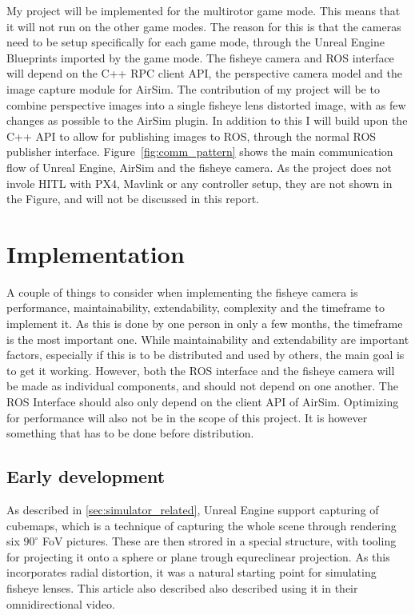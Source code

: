My project will be implemented for the multirotor game mode. This means that it will not run on the other game modes. The reason for this is that the cameras need to be setup specifically for each game mode, through the Unreal Engine Blueprints imported by the game mode. The fisheye camera and ROS interface will depend on the C++ RPC client API, the perspective camera model and the image capture module for AirSim. The contribution of my project will be to combine perspective images into a single fisheye lens distorted image, with as few changes as possible to the AirSim plugin. In addition to this I will build upon the C++ API to allow for publishing images to ROS, through the normal ROS publisher interface. Figure~\ref{fig:comm_pattern} shows the main communication flow of Unreal Engine, AirSim and the fisheye camera. As the project does not invole HITL with PX4, Mavlink or any controller setup, they are not shown in the Figure, and will not be discussed in this report.

\section{Implementation}

A couple of things to consider when implementing the fisheye camera is performance, maintainability, extendability, complexity and the timeframe to implement it. As this is done by one person in only a few months, the timeframe is the most important one. While maintainability and extendability are important factors, especially if this is to be distributed and used by others, the main goal is to get it working. However, both the ROS interface and the fisheye camera will be made as individual components, and should not depend on one another. The ROS Interface should also only depend on the client API of AirSim. Optimizing for performance will also not be in the scope of this project. It is however something that has to be done before distribution.

\subsection{Early development}

As described in \ref{sec:simulator_related}, Unreal Engine support capturing of cubemaps, which is a technique of capturing the whole scene through rendering six $90^\circ$ FoV pictures. These are then strored in a special structure, with tooling for projecting it onto a sphere or plane trough equreclinear projection. As this incorporates radial distortion, it was a natural starting point for simulating fisheye lenses. This article \cite{UnrealCubeCapture} also described also described using it in their omnidirectional video.

